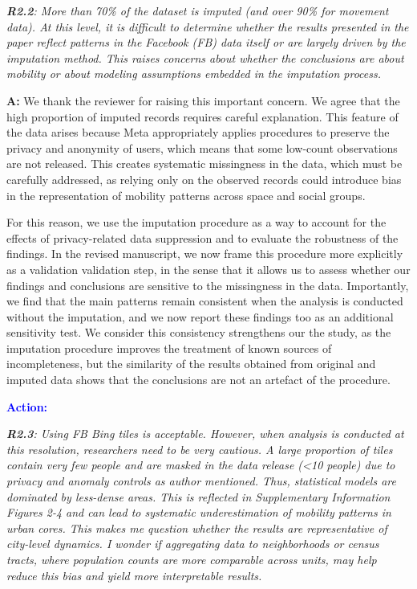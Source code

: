 \documentclass[12pt,a4paper,oneside, reqno]{amsart}
\begin{document}
\setlength{\leftskip}{0cm} \textit{\textbf{R2.2}: More than 70\% of the dataset is imputed (and over 90\% for movement data). At this level, it is difficult to determine whether the results presented in the paper reflect patterns in the Facebook (FB) data itself or are largely driven by the imputation method. This raises concerns about whether the conclusions are about mobility or about modeling assumptions embedded in the imputation process.}

\setlength{\leftskip}{1cm}\textbf{A:}  We thank the reviewer for raising this important concern. We agree that the high proportion of imputed records requires careful explanation. This feature of the data arises because Meta appropriately applies procedures to preserve the privacy and anonymity of users, which means that some low-count observations are not released. This creates systematic missingness in the data, which must be carefully addressed, as relying only on the observed records could introduce bias in the representation of mobility patterns across space and social groups.

For this reason, we use the imputation procedure as a way to account for the effects of privacy-related data suppression and to evaluate the robustness of the findings. In the revised manuscript, we now frame this procedure more explicitly as a validation validation step, in the sense that it allows us to assess whether our findings and conclusions are sensitive to the missingness in the data. Importantly, we find that the main patterns remain consistent when the analysis is conducted without the imputation, and we now report these findings too as an additional sensitivity test. We consider this consistency strengthens our the study, as the imputation procedure improves the treatment of known sources of incompleteness, but the similarity of the results obtained from original and imputed data shows that the conclusions are not an artefact of the procedure.

\textcolor{blue}{\textbf{Action:}}

\setlength{\leftskip}{0cm} \textit{\textbf{R2.3}: Using FB Bing tiles is acceptable. However, when analysis is conducted at this resolution, researchers need to be very cautious. A large proportion of tiles contain very few people and are masked in the data release (<10 people) due to privacy and anomaly controls as author mentioned. Thus, statistical models are dominated by less-dense areas. This is reflected in Supplementary Information Figures 2-4 and can lead to systematic underestimation of mobility patterns in urban cores. This makes me question whether the results are representative of city-level dynamics. I wonder if aggregating data to neighborhoods or census tracts, where population counts are more comparable across units, may help reduce this bias and yield more interpretable results.}
\end{document}
